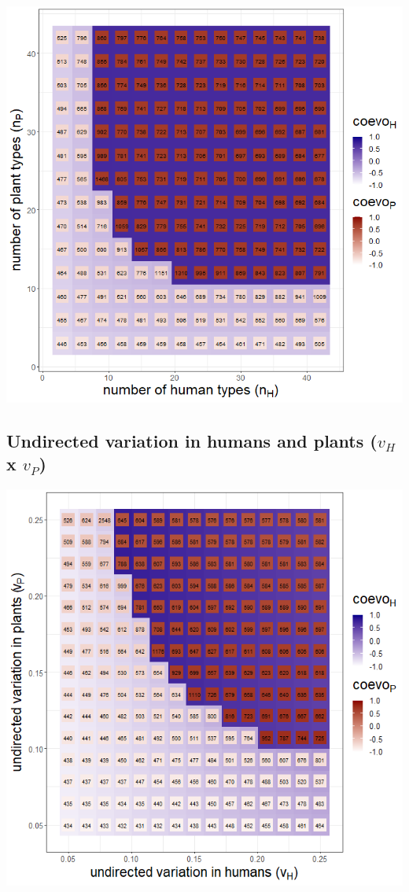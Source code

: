 \documentclass[
]{book}
\begin{document}
\includegraphics[width=1\linewidth]{plots/3_exp_number_types-tripleRaster_twoParameters}

\newpage

\hypertarget{undirected-variation-in-humans-and-plants-v_h-x-v_p}{%
\subsection{\texorpdfstring{Undirected variation in humans and plants (\(v_{H}\) x \(v_{P}\))}{Undirected variation in humans and plants (v\_\{H\} x v\_\{P\})}}\label{undirected-variation-in-humans-and-plants-v_h-x-v_p}}


\includegraphics[width=1\linewidth]{plots/3_exp_undirected_variation-tripleRaster_twoParameters}
\end{document}
